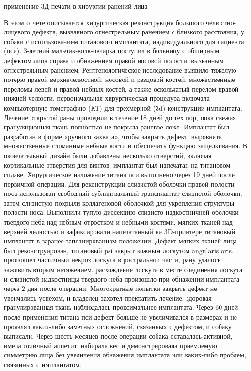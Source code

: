 применение 3Д-печати в хирургии ранений лица

В этом отчете описывается хирургическая реконструкция большого челюстно-лицевого
дефекта, вызванного огнестрельным ранением с близкого расстояния, у собаки с
использованием титанового имплантата, индивидуального для пациента (пси).
3-летний мальчик-волк-овчарка поступил в больницу с обширным дефектом лица
справа и обнажением правой носовой полости, вызванным огнестрельным ранением.
Рентгенологическое исследование выявило тяжелую потерю правой верхнечелюстной,
носовой и резцовой костей, множественные переломы левой и правой небных костей,
а также оскольчатый перелом правой нижней челюсти. первоначальная хирургическая
процедура включала компьютерную томографию (КТ) для трехмерной (3d) конструкции
имплантата. Лечение открытой раны проводили в течение 18 дней до тех пор, пока
свежая грануляционная ткань полностью не покрыла раневое ложе. Имплантат был
разработан в форме «ручного захвата», чтобы закрыть дефект, выровнять
множественные сломанные небные кости и обеспечить функцию защелкивания. В
окончательный дизайн были добавлены несколько отверстий, включая кортикальные
отверстия для винтов. имплантат был напечатан на титановом сплаве. Хирургическое
наложение титана пси выполнено через 19 дней после первичной операции. Для
реконструкции слизистой оболочки правой полости носа использован свободный
сублингвальный трансплантат слизистой оболочки. затем слизистую покрыли
коллагеновой оболочкой для укрепления структуры полости носа. Выполнили тупую
диссекцию слизисто-надкостничной оболочки твердого неба над небным отростком и
небными костями, мягких тканей над верхней челюстью и зафиксировали напечатанный
на 3D-принтере титановый имплантат в заранее запланированном положении. Дефект
мягких тканей лица был реконструирован, титановый psi закрыт кожным лоскутом
angularis oris. произошел частичный некроз лоскута в ростральной части, рану
удалось заживить вторым натяжением. расхождение лоскута в месте соединения
лоскута и слизистой надкостницы твердого неба произошло при обнажении имплантата
через 2 дня после операции. Многократные попытки закрыть дефект не увенчались
успехом, и владелец захотел прекратить лечение. здоровая гранулированная ткань
наблюдалась проксимальнее имплантата. Через 60 дней после применения титана пси
дефект больше не увеличивался в размерах и не проявлял каких-либо заметных
осложнений, связанных с дефектом, и собаку выписали. Через шесть месяцев после
операции собака оставалась активной, имела отличный аппетит, набирала вес и
демонстрировала приемлемую симметрию лица без увеличения обнажения имплантата
или каких-либо проблем, связанных с имплантатом.\cite{yang2022}

